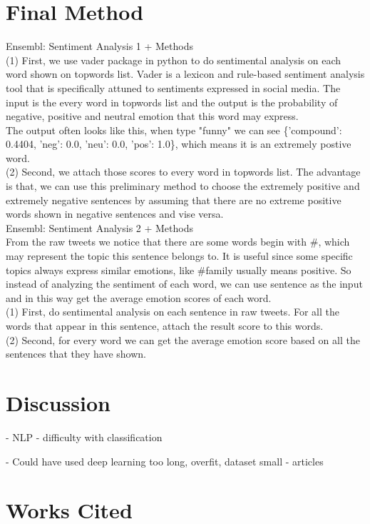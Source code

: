 \documentclass[]{article}
\begin{document}
\section{Final Method}

Ensembl: Sentiment Analysis 1 + Methods \\
(1) First, we use vader package in python to do sentimental analysis on each word shown on topwords list. Vader is a lexicon and rule-based sentiment analysis tool that is specifically attuned to sentiments expressed in social media.
The input is the every word in topwords list and the output is the probability of negative, positive and neutral emotion that this word may express. \\
The output often looks like this, when type "funny" we can see \{'compound': 0.4404, 'neg': 0.0, 'neu': 0.0, 'pos': 1.0\}, which means it is an extremely postive word. \\
(2) Second, we attach those scores to every word in topwords list. The advantage is that, we can use this preliminary method to choose the extremely positive and extremely negative sentences by assuming that there are no
extreme positive words shown in negative sentences and vise versa. \\

Ensembl: Sentiment Analysis 2 + Methods\\
From the raw tweets we notice that there are some words begin with \#, which may represent the topic this sentence belongs to. It is useful since some specific topics always express similar emotions, like \#family usually means positive.
So instead of analyzing the sentiment of each word, we can use sentence as the input and in this way get the average emotion scores of each word.\\
(1) First, do sentimental analysis on each sentence in raw tweets. For all the words that appear in this sentence, attach the result score to this words. \\
(2) Second, for every word we can get the average emotion score based on all the sentences that they have shown.




\section{Discussion}

- NLP - difficulty with classification 

- Could have used deep learning 
	too long, overfit, dataset small
- articles 


\section{Works Cited}
\begin{thebibliography}{1}


\end{thebibliography}
\end{document}
